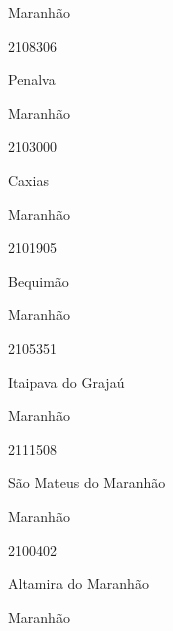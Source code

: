 \documentclass[
  letterpaper,
]{report}
\begin{document}
\n    

\n    

\n      

Maranhão

\n      

2108306

\n      

Penalva

\n    

\n    

\n      

Maranhão

\n      

2103000

\n      

Caxias

\n    

\n    

\n      

Maranhão

\n      

2101905

\n      

Bequimão

\n    

\n    

\n      

Maranhão

\n      

2105351

\n      

Itaipava do Grajaú

\n    

\n    

\n      

Maranhão

\n      

2111508

\n      

São Mateus do Maranhão

\n    

\n    

\n      

Maranhão

\n      

2100402

\n      

Altamira do Maranhão

\n    

\n    

\n      

Maranhão

\n      
\end{document}
